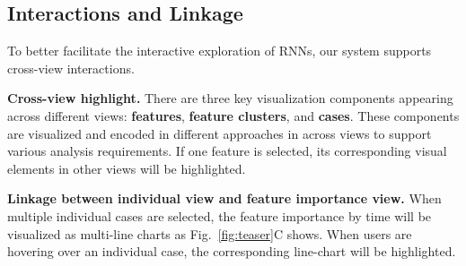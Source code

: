 \subsection{Interactions and Linkage}
To better facilitate the interactive exploration of RNNs, our system supports cross-view interactions. 

\textbf{Cross-view highlight.} 
There are three key visualization components appearing across different views: \textbf{features}, \textbf{feature clusters}, and \textbf{cases}. 
These components are visualized and encoded in different approaches in across views to support various analysis requirements. 
If one feature is selected, its corresponding visual elements in other views will be highlighted.


\textbf{Linkage between individual view and feature importance view.} 
When multiple individual cases are selected, the feature importance by time will be visualized as multi-line charts as Fig.~\ref{fig:teaser}C shows. 
When users are hovering over an individual case, the corresponding line-chart will be highlighted. 


